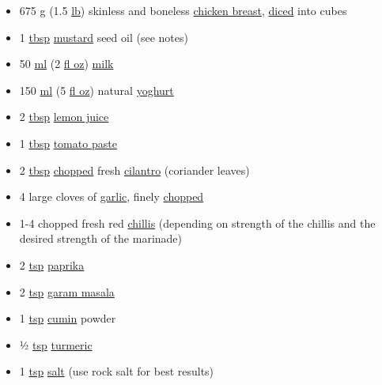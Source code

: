 \documentclass[11pt,a4paper]{article}
\begin{document}
\begin{itemize}
\item 675 \href{https://en.wikibooks.org/wiki/Cookbook:G}{g} (1.5 \href{https://en.wikibooks.org/wiki/Cookbook:Pound}{lb}) skinless and boneless \href{https://en.wikibooks.org/wiki/Cookbook:Chicken\#Breast}{chicken breast}, \href{https://en.wikibooks.org/wiki/Cookbook:Dice}{diced} into cubes
\item 1 \href{https://en.wikibooks.org/wiki/Cookbook:Tablespoon}{tbsp} \href{https://en.wikibooks.org/wiki/Cookbook:Mustard}{mustard} seed oil (see notes)
\item 50 \href{https://en.wikibooks.org/wiki/Cookbook:ML}{ml} (2 \href{https://en.wikibooks.org/wiki/Cookbook:Fluid\_Ounce}{fl oz}) \href{https://en.wikibooks.org/wiki/Cookbook:Milk}{milk}
\item 150 \href{https://en.wikibooks.org/wiki/Cookbook:ML}{ml} (5 \href{https://en.wikibooks.org/wiki/Cookbook:Fluid\_Ounce}{fl oz}) natural \href{https://en.wikibooks.org/wiki/Cookbook:Yogurt}{yoghurt}
\item 2 \href{https://en.wikibooks.org/wiki/Cookbook:Tablespoon}{tbsp} \href{https://en.wikibooks.org/wiki/Cookbook:Lemon\_Juice}{lemon juice}
\item 1 \href{https://en.wikibooks.org/wiki/Cookbook:Tablespoon}{tbsp} \href{https://en.wikibooks.org/wiki/Cookbook:Tomato\_Paste}{tomato paste}
\item 2 \href{https://en.wikibooks.org/wiki/Cookbook:Tablespoon}{tbsp} \href{https://en.wikibooks.org/wiki/Cookbook:Chopping}{chopped} fresh \href{https://en.wikibooks.org/wiki/Cookbook:Cilantro}{cilantro} (coriander leaves)
\item 4 large cloves of \href{https://en.wikibooks.org/wiki/Cookbook:Garlic}{garlic}, finely \href{https://en.wikibooks.org/wiki/Cookbook:Chop}{chopped}
\item 1-4 chopped fresh red \href{https://en.wikibooks.org/wiki/Cookbook:Chili\_Pepper}{chillis} (depending on strength of the chillis and the desired strength of the marinade)
\item 2 \href{https://en.wikibooks.org/wiki/Cookbook:Teaspoon}{tsp} \href{https://en.wikibooks.org/wiki/Cookbook:Paprika}{paprika}
\item 2 \href{https://en.wikibooks.org/wiki/Cookbook:Teaspoon}{tsp} \href{https://en.wikibooks.org/wiki/Cookbook:Garam\_Masala}{garam masala}
\item 1 \href{https://en.wikibooks.org/wiki/Cookbook:Teaspoon}{tsp} \href{https://en.wikibooks.org/wiki/Cookbook:Cumin}{cumin} powder
\item ½ \href{https://en.wikibooks.org/wiki/Cookbook:Teaspoon}{tsp} \href{https://en.wikibooks.org/wiki/Cookbook:Turmeric}{turmeric}
\item 1 \href{https://en.wikibooks.org/wiki/Cookbook:Teaspoon}{tsp} \href{https://en.wikibooks.org/wiki/Cookbook:Salt}{salt} (use rock salt for best results)
\end{itemize}
\end{document}
